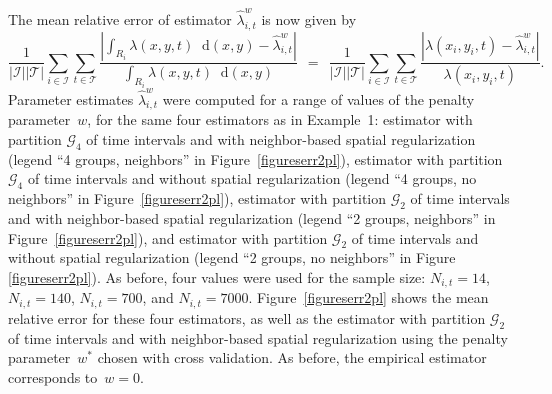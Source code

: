 \documentclass[article]{jss}
\def\diff{\mathop{}\!\mathrm{d}}
\begin{document}
The mean relative error of estimator $\hat{\lambda}^{w}_{i,t}$ is now given by
\[
\frac{1}{|\mathcal{I}| |\mathcal{T}|} \sum_{i \in \mathcal{I}} \sum_{t \in \mathcal{T}} \frac{\left|\displaystyle \int_{R_{i}} \lambda(x,y,t) \diff(x,y) - \hat{\lambda}^{w}_{i,t}\right|}{\displaystyle \int_{R_{i}} \lambda(x,y,t) \diff(x,y)}
\ \ = \ \ \frac{1}{|\mathcal{I}| |\mathcal{T}|} \sum_{i \in \mathcal{I}} \sum_{t \in \mathcal{T}} \frac{\left|\lambda(x_{i},y_{i},t) - \hat{\lambda}^{w}_{i,t}\right|}{\lambda(x_{i},y_{i},t)}.
\]
Parameter estimates $\hat{\lambda}^{w}_{i,t}$ were computed for a range of values of the penalty parameter~$w$, for the same four estimators as in Example~1: estimator with partition $\mathcal{G}_{4}$ of time intervals and with neighbor-based spatial regularization (legend ``4 groups, neighbors'' in Figure~\ref{figureserr2pl}), estimator with partition $\mathcal{G}_{4}$ of time intervals and without spatial regularization (legend ``4 groups, no neighbors'' in Figure~\ref{figureserr2pl}), estimator with partition $\mathcal{G}_{2}$ of time intervals and with neighbor-based spatial regularization (legend ``2 groups, neighbors'' in Figure~\ref{figureserr2pl}), and estimator with partition $\mathcal{G}_{2}$ of time intervals and without spatial regularization (legend ``2 groups, no neighbors'' in Figure \ref{figureserr2pl}).
As before, four values were used for the sample size: $N_{i,t} = 14$, $N_{i,t} = 140$, $N_{i,t} = 700$, and $N_{i,t} = 7000$.
Figure~\ref{figureserr2pl} shows the mean relative error for these four estimators, as well as the estimator with partition $\mathcal{G}_{2}$ of time intervals and with neighbor-based spatial regularization using the penalty parameter~$w^*$ chosen with cross validation.
As before, the empirical estimator corresponds to~$w = 0$.
\end{document}
